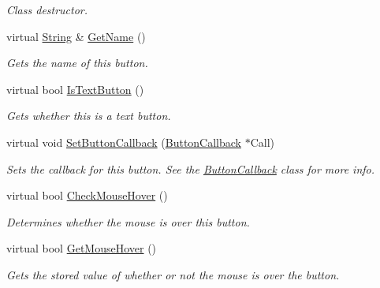 \begin{DoxyCompactItemize}
\begin{DoxyCompactList}\small\item\em Class destructor. \item\end{DoxyCompactList}\item 
virtual \hyperlink{namespacephys_aa03900411993de7fbfec4789bc1d392e}{String} \& \hyperlink{classphys_1_1UI_1_1Button_a366ba1ddf5064cafdfae63457472b2a2}{GetName} ()
\begin{DoxyCompactList}\small\item\em Gets the name of this button. \item\end{DoxyCompactList}\item 
virtual bool \hyperlink{classphys_1_1UI_1_1Button_a9c575f6433a5a455dc8c5de73d37839c}{IsTextButton} ()
\begin{DoxyCompactList}\small\item\em Gets whether this is a text button. \item\end{DoxyCompactList}\item 
virtual void \hyperlink{classphys_1_1UI_1_1Button_aa9f8c1e2e91e22405bacd298c88eb845}{SetButtonCallback} (\hyperlink{classphys_1_1UI_1_1ButtonCallback}{ButtonCallback} $\ast$Call)
\begin{DoxyCompactList}\small\item\em Sets the callback for this button. See the \hyperlink{classphys_1_1UI_1_1ButtonCallback}{ButtonCallback} class for more info. \item\end{DoxyCompactList}\item 
virtual bool \hyperlink{classphys_1_1UI_1_1Button_a72d76501d15053e3fbd9e7eb933e22de}{CheckMouseHover} ()
\begin{DoxyCompactList}\small\item\em Determines whether the mouse is over this button. \item\end{DoxyCompactList}\item 
virtual bool \hyperlink{classphys_1_1UI_1_1Button_a66522ebf5f3c75e96a6dfd99700a0f74}{GetMouseHover} ()
\begin{DoxyCompactList}\small\item\em Gets the stored value of whether or not the mouse is over the button. \item\end{DoxyCompactList}\item 

\end{DoxyCompactItemize}
